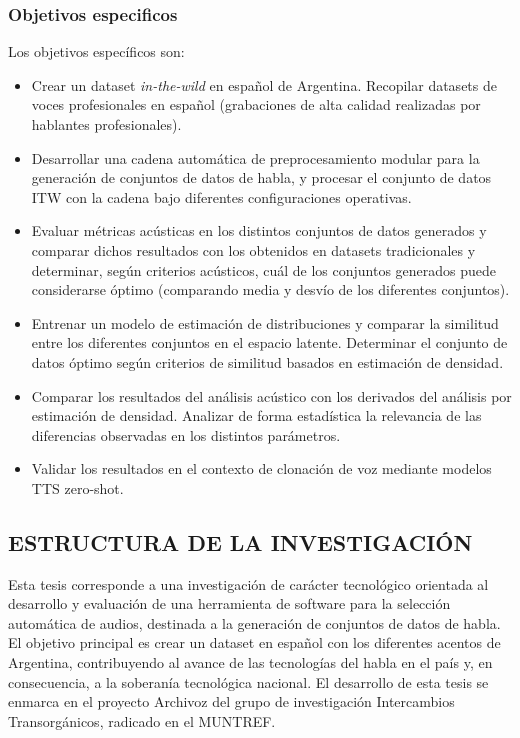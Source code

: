 \subsubsection{Objetivos especificos}

Los objetivos específicos son:

\begin{itemize}
    \item Crear un dataset \emph{in-the-wild} en español de Argentina. Recopilar datasets de voces profesionales en español (grabaciones de alta calidad realizadas por hablantes profesionales).
    \item Desarrollar una cadena automática de preprocesamiento modular para la generación de conjuntos de datos de habla, y procesar el conjunto de datos ITW con la cadena bajo diferentes configuraciones operativas.
    \item Evaluar métricas acústicas en los distintos conjuntos de datos generados y comparar dichos resultados con los obtenidos en datasets tradicionales y determinar, según criterios acústicos, cuál de los conjuntos generados puede considerarse óptimo (comparando media y desvío de los diferentes conjuntos).
    \item Entrenar un modelo de estimación de distribuciones y comparar la similitud entre los diferentes conjuntos en el espacio latente. Determinar el conjunto de datos óptimo según criterios de similitud basados en estimación de densidad.
    \item Comparar los resultados del análisis acústico con los derivados del análisis por estimación de densidad. Analizar de forma estadística la relevancia de las diferencias observadas en los distintos parámetros.
    \item Validar los resultados en el contexto de clonación de voz mediante modelos TTS zero-shot.
\end{itemize}

\subsection{ESTRUCTURA DE LA INVESTIGACIÓN}

Esta tesis corresponde a una investigación de carácter tecnológico orientada al desarrollo y evaluación de una herramienta de software para la selección automática de audios, destinada a la generación de conjuntos de datos de habla. El objetivo principal es crear un dataset en español con los diferentes acentos de Argentina, contribuyendo al avance de las tecnologías del habla en el país y, en consecuencia, a la soberanía tecnológica nacional. El desarrollo de esta tesis se enmarca en el proyecto Archivoz del grupo de investigación Intercambios Transorgánicos, radicado en el MUNTREF.

